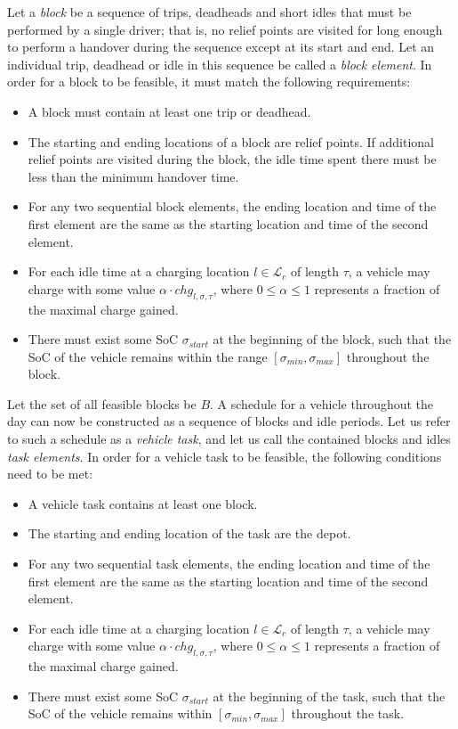 \documentclass[]{article}
\begin{document}
\noindent Let a \emph{block} be a sequence of trips, deadheads and short idles that must be performed by a single driver; that is, no relief points are visited for long enough to perform a handover during the sequence except at its start and end. Let an individual trip, deadhead or idle in this sequence be called a \emph{block element}. In order for a block to be feasible, it must match the following requirements: 
\begin{itemize}
  \item A block must contain at least one trip or deadhead.
  \item The starting and ending locations of a block are relief points. If additional relief points are visited during the block, the idle time spent there must be less than the minimum handover time.
  \item For any two sequential block elements, the ending location and time of the first element are the same as the starting location and time of the second element.
  \item For each idle time at a charging location $l \in \mathcal{L}_c$ of length $\tau$, a vehicle may charge with some value $\alpha \cdot chg_{l,\sigma,\tau}$, where $0 \leq \alpha \leq 1$ represents a fraction of the maximal charge gained. 
  \item There must exist some SoC $\sigma_{start}$ at the beginning of the block, such that the SoC of the vehicle remains within the range $[ \sigma_{min}, \sigma_{max} ]$ throughout the block.
\end{itemize}
Let the set of all feasible blocks be $B$. A schedule for a vehicle throughout the day can now be constructed as a sequence of blocks and idle periods. Let us refer to such a schedule as a \textit{vehicle task}, and let us call the contained blocks and idles \emph{task elements}. In order for a vehicle task to be feasible, the following conditions need to be met:
\begin{itemize}
  \item A vehicle task contains at least one block. 
  \item The starting and ending location of the task are the depot. 
  \item For any two sequential task elements, the ending location and time of the first element are the same as the starting location and time of the second element.
  \item For each idle time at a charging location $l \in \mathcal{L}_c$ of length $\tau$, a vehicle may charge with some value $\alpha \cdot chg_{l,\sigma,\tau}$, where $0 \leq \alpha \leq 1$ represents a fraction of the maximal charge gained. 
  \item There must exist some SoC $\sigma_{start}$ at the beginning of the task, such that the SoC of the vehicle remains within $[ \sigma_{min}, \sigma_{max} ]$ throughout the task.
\end{itemize}
\end{document}
